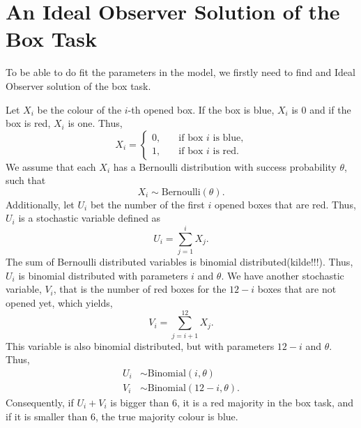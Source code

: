 
\chapter[An Ideal Observer Solution of the Box Task]{An Ideal Observer Solution of the Box Task}
To be able to do fit the parameters in the model, we firstly need to find and Ideal Observer solution of the box task. %

Let $X_i$ be the colour of the $i$-th opened box. If the box is blue, $X_i$ is 0 and if the box is red, $X_i$ is one. Thus,
\begin{equation*}
    X_i = \begin{cases}
    0,& \quad \text{if box } i \text{ is blue,}\\
    1,& \quad \text{if box } i \text{ is red.}
    \end{cases}
\end{equation*}
We assume that each $X_i$ has a Bernoulli distribution with success probability $\theta$, such that
\begin{equation*}
    X_i \sim \text{Bernoulli}(\theta).
\end{equation*}
Additionally, let $U_i$ bet the number of the first $i$ opened boxes that are red. Thus, $U_i$ is a stochastic variable defined as
\begin{equation*}
    U_i = \sum_{j=1}^{i} X_j. 
\end{equation*}
The sum of Bernoulli distributed variables is binomial distributed(kilde!!!). Thus, $U_i$ is binomial distributed with parameters $i$ and $\theta$. We have another stochastic variable, $V_i$, that is the number of red boxes for the $12-i$ boxes that are not opened yet, which yields,
\begin{equation*}
    V_i = \sum_{j=i+1}^{12} X_j.
\end{equation*}
This variable is also binomial distributed, but with parameters $12-i$ and $\theta$. Thus,
\begin{equation*}
    \begin{aligned}
        U_i &\sim \text{Binomial}(i,\theta)\\
        V_i &\sim \text{Binomial}(12-i,\theta).
    \end{aligned}
\end{equation*}
Consequently, if $U_i+V_i$ is bigger than 6, it is a red majority in the box task, and if it is smaller than 6, the true majority colour is blue. 

